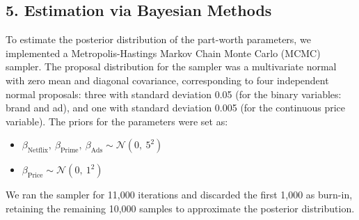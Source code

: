 \documentclass[
  letterpaper,
  DIV=11,
  numbers=noendperiod]{scrartcl}
\providecommand{\tightlist}{%
  \setlength{\itemsep}{0pt}\setlength{\parskip}{0pt}}\usepackage{longtable,booktabs,array}
\begin{document}
\subsection{5. Estimation via Bayesian
Methods}\label{estimation-via-bayesian-methods}

To estimate the posterior distribution of the part-worth parameters, we
implemented a Metropolis-Hastings Markov Chain Monte Carlo (MCMC)
sampler. The proposal distribution for the sampler was a multivariate
normal with zero mean and diagonal covariance, corresponding to four
independent normal proposals: three with standard deviation 0.05 (for
the binary variables: brand and ad), and one with standard deviation
0.005 (for the continuous price variable). The priors for the parameters
were set as:

\begin{itemize}
\tightlist
\item
  \(\beta_{\text{Netflix}},\ \beta_{\text{Prime}},\ \beta_{\text{Ads}} \sim \mathcal{N}(0,\ 5^2)\)
\item
  \(\beta_{\text{Price}} \sim \mathcal{N}(0,\ 1^2)\)
\end{itemize}

We ran the sampler for 11,000 iterations and discarded the first 1,000
as burn-in, retaining the remaining 10,000 samples to approximate the
posterior distribution.
\end{document}
